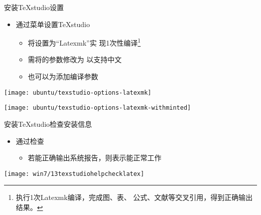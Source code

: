 \documentclass[fontset = none, t]{ctexbeamer}
\begin{document}
\begin{frame}{安装TeXstudio}{设置}
  \begin{spacing}{1.5}
    \begin{itemize}
    \item 通过菜单设置TeXstudio%
      \begin{itemize}
      \item 将设置为\alert{\enquote{Latexmk}}实
        现1次性编译\footnote[frame,2]{执行1次Latexmk编译，完成图、表、
          公式、文献等交叉引用，得到正确输出结果。}
      \item 需将的参数修改为
        以支持中文
      \item 也可以为添加编译参数
      \end{itemize}
    \end{itemize}
    \begin{center}
      \begin{annotatedFigure}
        {\texttt{[image: ubuntu/texstudio-options-latexmk]}}
      \end{annotatedFigure}
      \begin{annotatedFigure}
        {\texttt{[image: ubuntu/texstudio-options-latexmk-withminted]}}
      \end{annotatedFigure}
    \end{center}
  \end{spacing}
\end{frame}

\begin{frame}{安装TeXstudio}{检查\tl 安装信息}
  \begin{spacing}{1.2}
    \begin{itemize}
    \item 通过检查%
      \begin{itemize}
      \item 若能正确输出\alert{系统报告}，则表示\tl 能正常工作
      \end{itemize}
    \end{itemize}
    \begin{center}
      \texttt{[image: win7/13texstudiohelpchecklatex]}\\
    \end{center}
  \end{spacing}
\end{frame}
\end{document}
